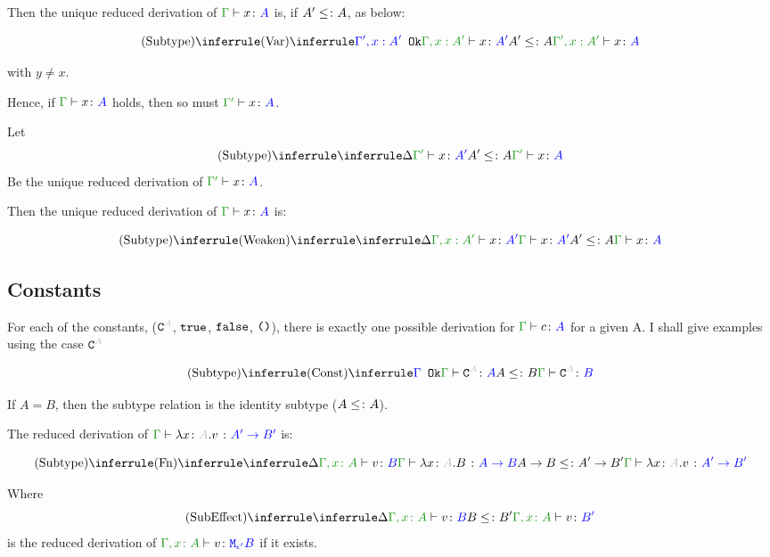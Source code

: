 \documentclass{report}
\begin{document}
Then the unique reduced derivation of $\gtyperelation{x}{A}$ is, if $A' \leq\colon A$, as below:

\begin{equation}
    \ntreeruleII{Subtype}{\ntreeruleI{Var}{\ok{\G', x: A'}}{\typerelation{\G,x: A'}{x}{A'}}}{ A' \subtype A}{\typerelation{\G', x: A'}{x}{A}}
\end{equation}

 with $y \neq x$.

Hence, if $\gtyperelation{x}{A}$ holds, then so must $\typerelation{\G'}{x}{A}$.

Let 
\begin{equation}
    \deltavrule{\G'}{x}{A'}{A}
\end{equation}
Be the  unique reduced derivation of $\typerelation{\G'}{x}{A}$.

Then the unique reduced derivation of $\gtyperelation{x}{A}$ is:


\begin{equation}
    \ntreeruleII{Subtype}{
        \ntreeruleI{Weaken}{
            \treeruleI{\D}{\typerelation{\G, x: A'}{x}{A'}}
        }{\gtyperelation{x}{A'}}   
    }{ A' \subtype A
    }{\gtyperelation{x}{A}}
\end{equation}

\subsection{Constants}
For each of the constants, ($\const{A}$, $\texttt{true}$, $\texttt{false}$, $\texttt{()}$), there is exactly one possible derivation for $\typerelation{\G}{c}{A}$ for a given A. I shall give examples using the case $\const{A}$


$$
    \ntreeruleII{Subtype}{\truleconst}{ A \subtype B}{\gtyperelation{\const{A}}{B}}
$$

If $A = B$, then the subtype relation is the identity subtype ($A \leq\colon A$).

The reduced derivation of $\gtyperelation{\lam{x}{A}{v}}{\fntype{A'}{B'}}$ is:


$$
\ntreeruleII{Subtype}
{\ntreeruleI{Fn}{\treeruleI{\D}{\typerelation{\gax}{v}{B}}}
{
    \gtyperelation{\lam{x}{A}{B}}{\ab}}
    }{
    \ab \subtype \fntype{A'}{B'}
}{
   \gtyperelation{\lam{x}{A}{v}}{\fntype{A'}{B'}} 
}
$$

Where 
\begin{equation}
    \ntreeruleII{SubEffect}{\treeruleI{\D}{\typerelation{\gax}{v}{B}}}{ B\subtype B'}{\typerelation{\gax}{v}{B'}}
\end{equation}
is the reduced derivation of $\typerelation{\gax}{v}{\M{\e'}{B}}$ if it exists.
\end{document}
